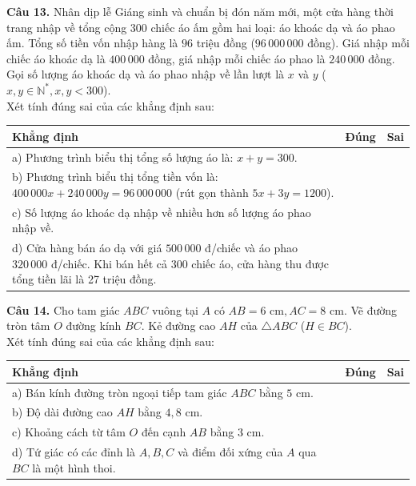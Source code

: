 \documentclass[11pt,a4paper]{article}
\begin{document}
\vspace{1.5mm}
\textbf{Câu 13.} Nhân dịp lễ Giáng sinh và chuẩn bị đón năm mới, một cửa hàng thời trang nhập về tổng cộng $300$ chiếc áo ấm gồm hai loại: áo khoác dạ và áo phao ấm. Tổng số tiền vốn nhập hàng là $96$ triệu đồng ($96\,000\,000$ đồng). Giá nhập mỗi chiếc áo khoác dạ là $400\,000$ đồng, giá nhập mỗi chiếc áo phao là $240\,000$ đồng. Gọi số lượng áo khoác dạ và áo phao nhập về lần lượt là $x$ và $y$ ($x, y \in \mathbb{N}^*, x, y < 300$).\\
Xét tính đúng sai của các khẳng định sau:
\begin{center}
\begin{tabularx}{\linewidth}{|X|c|c|}
\hline
\textbf{Khẳng định} & \textbf{Đúng} & \textbf{Sai} \\
\hline
a) Phương trình biểu thị tổng số lượng áo là: $x + y = 300$. & & \\
\hline
b) Phương trình biểu thị tổng tiền vốn là: $400\,000x + 240\,000y = 96\,000\,000$ (rút gọn thành $5x + 3y = 1200$). & & \\
\hline
c) Số lượng áo khoác dạ nhập về nhiều hơn số lượng áo phao nhập về. & & \\
\hline
d) Cửa hàng bán áo dạ với giá $500\,000$ đ/chiếc và áo phao $320\,000$ đ/chiếc. Khi bán hết cả 300 chiếc áo, cửa hàng thu được tổng tiền lãi là 27 triệu đồng. & & \\
\hline
\end{tabularx}
\end{center}

\vspace{2mm}
\textbf{Câu 14.} Cho tam giác $ABC$ vuông tại $A$ có $AB = 6\text{ cm}, AC = 8\text{ cm}$. Vẽ đường tròn tâm $O$ đường kính $BC$. Kẻ đường cao $AH$ của $\triangle ABC$ ($H \in BC$).\\
Xét tính đúng sai của các khẳng định sau:
\begin{center}
\begin{tabularx}{\linewidth}{|X|c|c|}
\hline
\textbf{Khẳng định} & \textbf{Đúng} & \textbf{Sai} \\
\hline
a) Bán kính đường tròn ngoại tiếp tam giác $ABC$ bằng $5\text{ cm}$. & & \\
\hline
b) Độ dài đường cao $AH$ bằng $4{,}8\text{ cm}$. & & \\
\hline
c) Khoảng cách từ tâm $O$ đến cạnh $AB$ bằng $3\text{ cm}$. & & \\
\hline
d) Tứ giác có các đỉnh là $A, B, C$ và điểm đối xứng của $A$ qua $BC$ là một hình thoi. & & \\
\hline
\end{tabularx}
\end{center}
\end{document}
